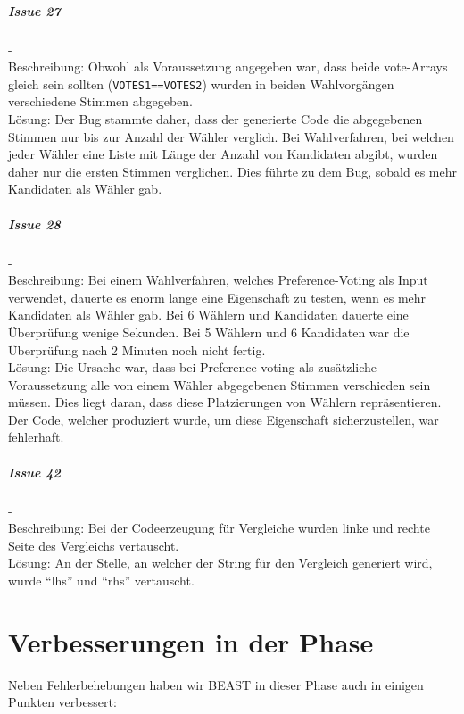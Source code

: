 \documentclass[a4paper]{scrreprt}
\begin{document}
\paragraph{Issue 27}- \\
Beschreibung: Obwohl als Voraussetzung angegeben war, dass beide vote-Arrays gleich sein sollten (\verb!VOTES1==VOTES2!) wurden in beiden Wahlvorgängen verschiedene Stimmen abgegeben.\\
Lösung: Der Bug stammte daher, dass der generierte Code die abgegebenen Stimmen nur bis zur Anzahl der Wähler verglich. Bei Wahlverfahren, bei welchen jeder Wähler eine Liste mit Länge der Anzahl von Kandidaten abgibt, wurden daher nur die ersten Stimmen verglichen. Dies führte zu dem Bug, sobald es mehr Kandidaten als Wähler gab.

\paragraph{Issue 28}- \\
Beschreibung: Bei einem Wahlverfahren, welches Preference-Voting als Input verwendet, dauerte es enorm lange eine Eigenschaft zu testen, wenn es mehr Kandidaten als Wähler gab. Bei 6 Wählern und Kandidaten dauerte eine Überprüfung wenige Sekunden. Bei 5 Wählern und 6 Kandidaten war die Überprüfung nach 2 Minuten noch nicht fertig.\\
Lösung: Die Ursache war, dass bei Preference-voting als zusätzliche Voraussetzung alle von einem Wähler abgegebenen Stimmen verschieden sein müssen. Dies liegt daran, dass diese Platzierungen von Wählern repräsentieren. Der Code, welcher produziert wurde, um diese Eigenschaft sicherzustellen, war fehlerhaft.

\paragraph{Issue 42}- \\
Beschreibung: Bei der Codeerzeugung für Vergleiche wurden linke und rechte Seite des Vergleichs vertauscht.\\
Lösung: An der Stelle, an welcher der String für den Vergleich generiert wird, wurde "`lhs"' und "`rhs"' vertauscht. 
 


\chapter{Verbesserungen in der Phase}
Neben Fehlerbehebungen haben wir BEAST in dieser Phase auch in einigen Punkten
verbessert:
\end{document}
